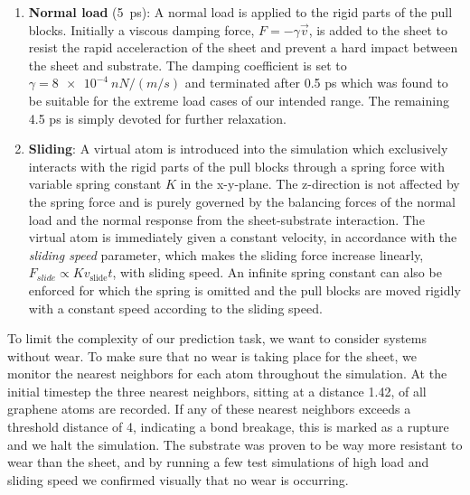 \begin{enumerate}
  \item \textbf{Normal load} (\SI{5}{ps}): A normal load is applied to the rigid
  parts of the pull blocks. Initially a viscous damping force, $F = -\gamma \vec{v}$, is added to the sheet to resist the rapid acceleraction of the sheet and prevent a hard impact between the sheet and substrate. The damping coefficient is set to $\gamma = \SI{8e-4}{nN/(m/s)}$ and terminated after 0.5 ps which was found to be suitable for the extreme load cases of our intended range. The remaining 4.5 ps is simply devoted for further relaxation. 
  \item \textbf{Sliding}: A virtual atom is introduced into the simulation which
  exclusively interacts with the rigid parts of the pull blocks through a spring force
  with variable spring constant $K$ in the x-y-plane. The z-direction is not
  affected by the spring force and is purely governed by the balancing forces of the normal load and the normal response from the sheet-substrate interaction. The
  virtual atom is immediately given a constant velocity, in accordance with
  the \textit{sliding speed} parameter, which makes the sliding force increase linearly, $F_{\textit{slide}} \propto Kv_{\text{slide}}t$, with sliding speed. An infinite spring constant can also be enforced for which the spring is omitted and the pull blocks are moved rigidly with a constant speed according to the sliding speed.
\end{enumerate}
To limit the complexity of our prediction task, we want to consider systems without wear. To make sure that no wear is taking place for the sheet, we monitor the nearest neighbors for each atom throughout the simulation. At the initial timestep the three nearest neighbors, sitting at a distance \SI{1.42}{}, of all graphene atoms are recorded. If any of these nearest neighbors exceeds a threshold distance of \SI{4}{}, indicating a bond breakage, this is marked as a rupture and we halt the simulation. The substrate was proven to be way more resistant to wear than the sheet, and by running a few test simulations of high load and sliding speed we confirmed visually that no wear is occurring.


